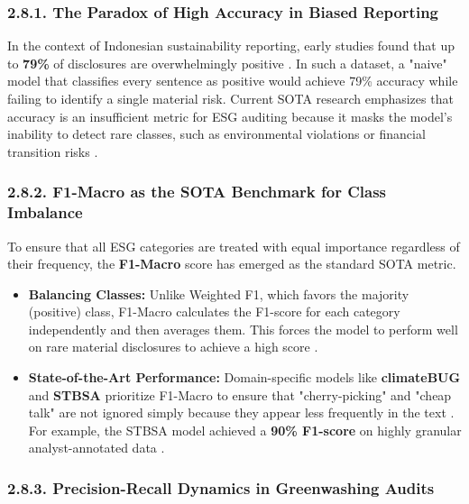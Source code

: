 \documentclass{article}
\begin{document}
\subsubsection*{2.8.1. The Paradox of High Accuracy in Biased Reporting}

In the context of Indonesian sustainability reporting, early studies found that up to \textbf{79\%} of disclosures are overwhelmingly positive  \parencite{iman_harymawan_f157109e}. In such a dataset, a "naive" model that classifies every sentence as positive would achieve 79\% accuracy while failing to identify a single material risk. Current SOTA research emphasizes that accuracy is an insufficient metric for ESG auditing because it masks the model's inability to detect rare classes, such as environmental violations or financial transition risks  \parencite{tae_sun_chung_e16a4c18}.
\subsubsection*{2.8.2. F1-Macro as the SOTA Benchmark for Class Imbalance}

To ensure that all ESG categories are treated with equal importance regardless of their frequency, the \textbf{F1-Macro} score has emerged as the standard SOTA metric.
\begin{itemize}
\item 

\textbf{Balancing Classes:} Unlike Weighted F1, which favors the majority (positive) class, F1-Macro calculates the F1-score for each category independently and then averages them. This forces the model to perform well on rare material disclosures to achieve a high score  \parencite{tae_sun_chung_e16a4c18}.\item 

\textbf{State-of-the-Art Performance:} Domain-specific models like \textbf{climateBUG} and \textbf{STBSA} prioritize F1-Macro to ensure that "cherry-picking" and "cheap talk" are not ignored simply because they appear less frequently in the text  \parencite[]{blaise_sandwidi_c58b16e0, yinan_yu_e282fd98}. For example, the STBSA model achieved a \textbf{90\% F1-score} on highly granular analyst-annotated data  \parencite{blaise_sandwidi_c58b16e0}.
\end{itemize}
\subsubsection*{2.8.3. Precision-Recall Dynamics in Greenwashing Audits}
\end{document}
